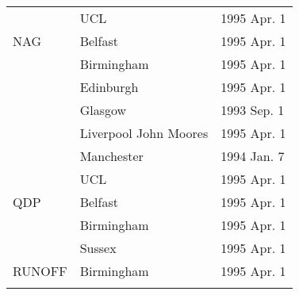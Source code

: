 \begin{table}
\begin{center}
\begin{tabular}{|p{36mm}|p{50mm}|p{30mm}|}
                      & UCL              & 1995 Apr. 1 \\
NAG                   & Belfast          & 1995 Apr. 1 \\
                      & Birmingham       & 1995 Apr. 1 \\
                      & Edinburgh        & 1995 Apr. 1 \\
                      & Glasgow          & 1993 Sep. 1 \\
                      & Liverpool John Moores & 1995 Apr. 1 \\
                      & Manchester       & 1994 Jan. 7 \\
                      & UCL              & 1995 Apr. 1 \\
QDP                   & Belfast          & 1995 Apr. 1 \\
                      & Birmingham       & 1995 Apr. 1 \\
                      & Sussex           & 1995 Apr. 1 \\
RUNOFF                & Birmingham       & 1995 Apr. 1 \\
& & \\ \hline
\end{tabular}
\end{center}
\end{table}

